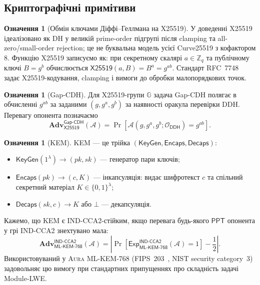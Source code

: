 \documentclass[11pt,a4paper]{article}
\theoremstyle{definition}
\newtheorem{definition}[theorem]{Означення}
\newcommand{\secpar}{\ensuremath{\lambda}}
\newcommand{\ppt}{\ensuremath{\mathsf{PPT}}}
\newcommand{\adv}{\ensuremath{\mathbf{Adv}}}
\newcommand{\advA}{\ensuremath{\mathcal{A}}}
\renewcommand{\DH}{\textsf{X25519}}
\newcommand{\KEM}{\textsf{ML-KEM-768}}
\newcommand{\KeyGen}{\textsf{KeyGen}}
\newcommand{\Encaps}{\textsf{Encaps}}
\newcommand{\Decaps}{\textsf{Decaps}}
\newcommand{\GapCDH}{\textsf{Gap-CDH}}
\newcommand{\DDH}{\textsf{DDH}}
\newcommand{\INDCCA}{\textsf{IND-CCA2}}
\newcommand{\Aura}{\mbox{\normalfont\scshape Aura}}
\begin{document}
\subsection{Криптографічні примітиви}\label{sec:primitives}

\begin{definition}[Обмін ключами Діффі--Геллмана на X25519]
\label{def:dh}
У доведенні X25519 ідеалізовано як DH у великій prime-order підгрупі після
clamping та all-zero/small-order rejection; це не буквальна модель усієї
Curve25519 з кофактором 8. Функцію \DH{} записуємо як: при секретному
скалярі $a \in \mathbb{Z}_q$ та публічному ключі $B = g^{b}$
обчислюється $\DH(a, B) = B^{a} = g^{ab}$. Стандарт
RFC~7748~\cite{rfc7748} задає X25519-кодування, clamping і вимоги до
обробки малопорядкових точок.
\end{definition}

\begin{definition}[\GapCDH{}]
\label{def:gap-cdh}
Для \DH{}-групи $\mathbb{G}$ задача \GapCDH{} полягає в обчисленні
$g^{ab}$ за заданими $(g,g^a,g^b)$ за наявності оракула перевірки
\DDH{}. Перевагу опонента позначаємо
\begin{equation}\label{eq:gap-cdh}
  \adv^{\GapCDH}_{\DH}(\advA)
  =
  \Pr[\advA(g,g^a,g^b;\mathcal{O}_{\DDH}) = g^{ab}].
\end{equation}
\end{definition}

\begin{definition}[KEM]
\label{def:kem}
KEM — це трійка $(\KeyGen, \Encaps, \Decaps)$:
\begin{itemize}
  \item $\KeyGen(1^{\secpar}) \to (\mathit{pk}, \mathit{sk})$ — генератор
    пари ключів;
  \item $\Encaps(\mathit{pk}) \to (c, K)$ — інкапсуляція: видає шифротекст
    $c$ та спільний секретний матеріал $K \in \{0,1\}^{\secpar}$;
  \item $\Decaps(\mathit{sk}, c) \to K$ або $\bot$ — декапсуляція.
\end{itemize}
Кажемо, що KEM є \INDCCA{}-стійким, якщо перевага будь-якого \ppt{}
опонента у грі IND-CCA2 знехтувано мала:
\begin{equation}\label{eq:indcca}
  \adv^{\INDCCA}_{\KEM}(\advA)
  =
  \left|\Pr[\mathsf{Exp}^{\INDCCA}_{\KEM}(\advA)=1]-\frac12\right|.
\end{equation}
Використовуваний у \Aura{}
ML-KEM-768 (FIPS~203~\cite{fips203}, NIST security category~3) задовольняє цю
вимогу при стандартних припущеннях про складність задачі \textsf{Module-LWE}.
\end{definition}
\end{document}
